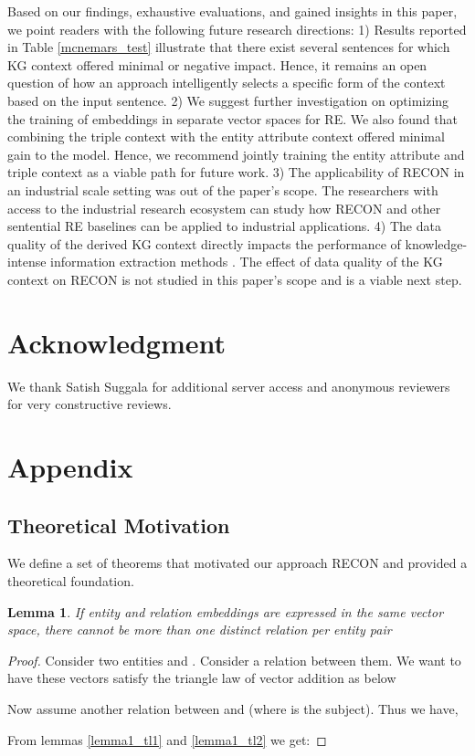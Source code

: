 \documentclass[sigconf]{acmart}
\newtheorem{lemma}{Lemma}[section]
\begin{document}
Based on our findings, exhaustive evaluations, and gained insights in this paper, we point readers with the following future research directions: 1) Results reported in Table \ref{mcnemars_test} illustrate that there exist several sentences for which KG context offered minimal or negative impact. Hence, it remains an open question of how an approach intelligently selects a specific form of the context based on the input sentence. 2) We suggest further investigation on optimizing the training of embeddings in separate vector spaces for RE. We also found that combining the triple context with the entity attribute context offered minimal gain to the model. Hence, we recommend jointly training the entity attribute and triple context as a viable path for future work. 3) The applicability of RECON in an industrial scale setting was out of the paper's scope. The researchers with access to the industrial research ecosystem can study how RECON and other sentential RE baselines can be applied to industrial applications. 4) The data quality of the derived KG context directly impacts the performance of knowledge-intense information extraction methods \cite{weichselbraun2018mining}. The effect of data quality of the KG context on RECON is not studied in this paper's scope and is a viable next step.

\section*{Acknowledgment} We thank Satish Suggala for additional server access and anonymous reviewers for very constructive reviews.



\section{Appendix}
\subsection{Theoretical Motivation} \label{sec:theory}
We define a set of theorems that motivated our approach RECON and provided a theoretical foundation.
\begin{lemma}\label{lemma1}
If entity and relation embeddings are expressed in the same vector space, there cannot be more than one distinct relation per entity pair
\end{lemma}
\begin{proof}
Consider two entities  and . Consider a relation  between them. We want to have these vectors satisfy the triangle law of vector addition as below

Now assume another relation  between  and  (where  is the subject). Thus we have,

From lemmas \ref{lemma1_tl1} and \ref{lemma1_tl2} we get: 
\end{proof}
\end{document}
